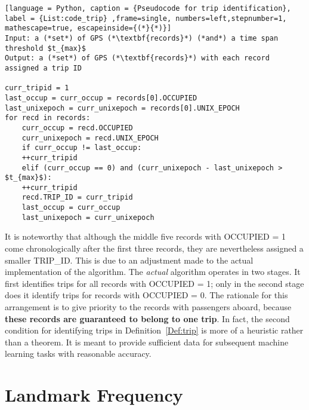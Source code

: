 \begin{lstlisting}[language = Python, caption = {Pseudocode for trip identification}, label = {List:code_trip} ,frame=single, numbers=left,stepnumber=1, mathescape=true, escapeinside={(*}{*)}]
Input: a (*set*) of GPS (*\textbf{records}*) (*and*) a time span threshold $t_{max}$
Output: a (*set*) of GPS (*\textbf{records}*) with each record assigned a trip ID

curr_tripid = 1
last_occup = curr_occup = records[0].OCCUPIED
last_unixepoch = curr_unixepoch = records[0].UNIX_EPOCH
for recd in records:
    curr_occup = recd.OCCUPIED
    curr_unixepoch = recd.UNIX_EPOCH
    if curr_occup != last_occup:
	++curr_tripid
    elif (curr_occup == 0) and (curr_unixepoch - last_unixepoch > $t_{max}$):
	++curr_tripid
    recd.TRIP_ID = curr_tripid
    last_occup = curr_occup
    last_unixepoch = curr_unixepoch
\end{lstlisting}

It is noteworthy that although the middle five records with OCCUPIED = 1 come chronologically after the first three records, they are nevertheless assigned a smaller TRIP\_ID. This is due to an adjustment made to the actual implementation of the algorithm. The \emph{actual} algorithm operates in two stages. It first identifies trips for all records with OCCUPIED = 1; only in the second stage does it identify trips for records with OCCUPIED = 0. The rationale for this arrangement is to give priority to the records with passengers aboard, because \textbf{these records are guaranteed to belong to one trip}. In fact, the second condition for identifying trips in Definition~\ref{Def:trip} is more of a heuristic rather than a theorem. It is meant to provide sufficient data for subsequent machine learning tasks with reasonable accuracy.

\section{Landmark Frequency}

